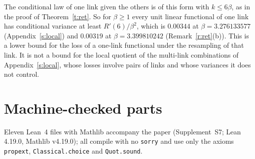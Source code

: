 \begin{remark}\label{r:haar}
The conditional law of one link given the others is of this form with $k\le6\beta$, as in the proof of
Theorem~\ref{t:ret}. So for $\beta\ge1$ every unit linear functional of one link has conditional variance at
least $R'(6)/\beta^2$, which is $0.00344$ at $\beta=3.276133577$ (Appendix~\ref{s:local}) and $0.00319$ at
$\beta=3.399810242$ (Remark~\ref{r:ret}(b)). This is
a lower bound for the loss of a one-link functional under the resampling of that link. It is not a bound for
the local quotient of the multi-link combinations of Appendix~\ref{s:local}, whose losses involve pairs of
links and whose variances it does not control.
\end{remark}

\section{Machine-checked parts}\label{s:lean}
Eleven Lean~4 files with Mathlib accompany the paper (Supplement~S7; Lean 4.19.0, Mathlib v4.19.0); all compile with no \texttt{sorry} and use
only the axioms \texttt{propext}, \texttt{Classical.choice} and \texttt{Quot.sound}.
